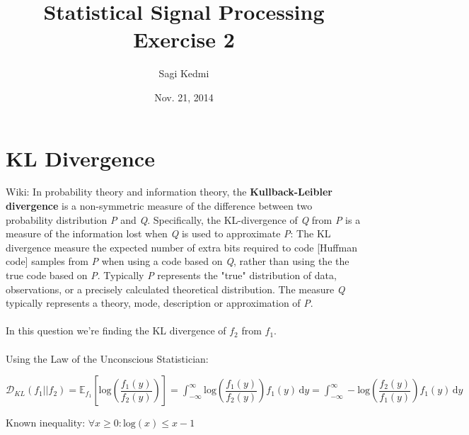\documentclass[10pt]{article}
\begin{document}
\title{Statistical Signal Processing\\Exercise 2}
\author{Sagi Kedmi}
\date{Nov. 21, 2014}
\maketitle
\section{KL Divergence}
Wiki: In probability theory and information theory, the \textbf{Kullback-Leibler divergence} is a non-symmetric measure of the difference between two probability distribution \textit{P} and \textit{Q}. Specifically, the KL-divergence of \textit{Q} from \textit{P} is a measure of the information lost when \textit{Q} is used to approximate \textit{P}: The KL divergence measure the expected number of extra bits required to code [Huffman code] samples from \textit{P} when using a code based on \textit{Q}, rather than using the the true code based on \textit{P}. Typically \textit{P} represents the "true" distribution of data, observations, or a precisely calculated theoretical distribution. The measure \textit{Q} typically represents a theory, mode, description or approximation of \textit{P}.
\\\\
In this question we're finding the KL divergence of $f_{2}$ from $f_{1}$.\\\\
Using the Law of the Unconscious Statistician:
\begin{center}
$\mathcal{D}_{KL}\left({f_{1}||f_{2}}\right)=\mathbb{E}_{f_{1}}\left[\mathrm{log}\left({\dfrac{f_{1}(y)}{f_{2}(y)}}\right)\right]={\displaystyle \int_{-\infty}^\infty \mathrm{log}\left({\dfrac{f_{1}(y)}{f_{2}(y)}}\right)f_{1}(y)\,\mathrm{d}y}={\displaystyle \int_{-\infty}^\infty -\mathrm{log}\left({\dfrac{f_{2}(y)}{f_{1}(y)}}\right)f_{1}(y)\,\mathrm{d}y}$
\end{center}
Known inequality: $\forall x\geq 0 : \mathrm{log}(x) \leq x-1$
\end{document}
